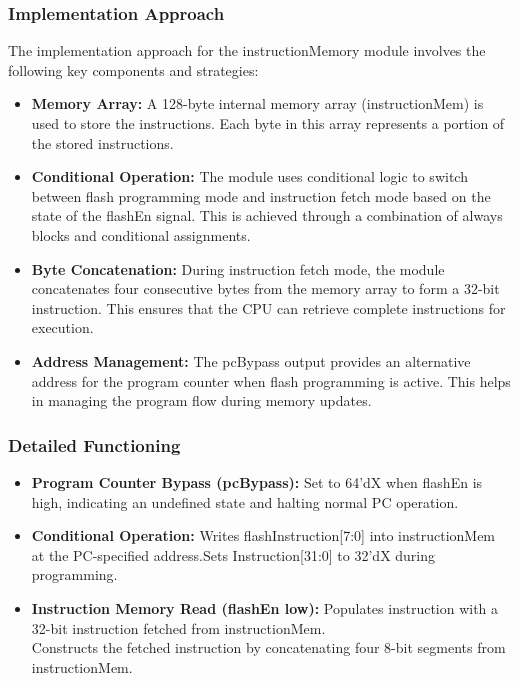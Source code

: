 \subsubsection{Implementation Approach}
The implementation approach for the instructionMemory module involves the following key components and strategies:
\begin{itemize}
    \item \textbf{Memory Array:} A 128-byte internal memory array (instructionMem) is used to store the instructions. Each byte in this array represents a portion of the stored instructions.
    \item \textbf{Conditional Operation:} The module uses conditional logic to switch between flash programming mode and instruction fetch mode based on the state of the flashEn signal. This is achieved through a combination of always blocks and conditional assignments.
    \item \textbf{Byte Concatenation:} During instruction fetch mode, the module concatenates four consecutive bytes from the memory array to form a 32-bit instruction. This ensures that the CPU can retrieve complete instructions for execution.
    \item \textbf{Address Management:} The pcBypass output provides an alternative address for the program counter when flash programming is active. This helps in managing the program flow during memory updates.

\end{itemize}

\subsubsection{Detailed Functioning}
\begin{itemize}
    \item \textbf{Program Counter Bypass (pcBypass):} Set to 64'dX when flashEn is high, indicating an undefined state and halting normal PC operation.
    \item \textbf{Conditional Operation:} Writes flashInstruction[7:0] into instructionMem at the PC-specified address.Sets Instruction[31:0] to 32'dX during programming.
    \item \textbf{Instruction Memory Read (flashEn low):} Populates instruction with a 32-bit instruction fetched from instructionMem.\\
    Constructs the fetched instruction by concatenating four 8-bit segments from instructionMem.

\end{itemize}
